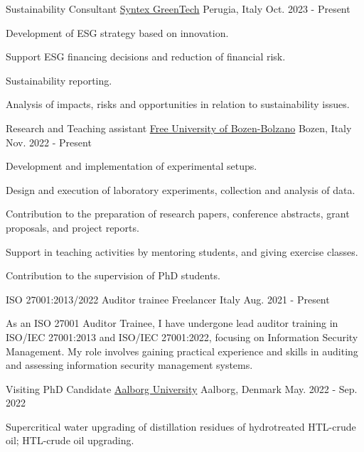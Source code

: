 
\begin{cventries}

\cventry
{Sustainability Consultant}
{\href{https://syntexgreen.tech}{Syntex GreenTech}}
{Perugia, Italy}
{Oct. 2023 - Present}
{\begin{cvitems}
\item {Development of ESG strategy based on innovation.}
\item {Support ESG financing decisions and reduction of financial risk.}
\item {Sustainability reporting.}
\item {Analysis of impacts, risks and opportunities in relation to sustainability issues.}
\end{cvitems}}

\cventry
{Research and Teaching assistant}
{\href{https://unibz.it}{Free University of Bozen-Bolzano}}
{Bozen, Italy}
{Nov. 2022 - Present}
{\begin{cvitems}
\item {Development and implementation of experimental setups.}
\item {Design and execution of laboratory experiments, collection and analysis of data.}
\item {Contribution to the preparation of research papers, conference abstracts, grant proposals, and project reports.}
\item {Support in teaching activities by mentoring students, and giving exercise classes.}
\item {Contribution to the supervision of PhD students.}
\end{cvitems}}

\cventry
{ISO 27001:2013/2022 Auditor trainee}
{Freelancer}
{Italy}
{Aug. 2021 - Present}
{\begin{cvitems}
\item {As an ISO 27001 Auditor Trainee, I have undergone lead auditor training in ISO/IEC 27001:2013 and ISO/IEC 27001:2022, focusing on Information Security Management. My role involves gaining practical experience and skills in auditing and assessing information security management systems.}
\end{cvitems}}

\cventry
{Visiting PhD Candidate}
{\href{https://www.en.aau.dk/}{Aalborg University}}
{Aalborg, Denmark}
{May. 2022 - Sep. 2022}
{\begin{cvitems}
\item {Supercritical water upgrading of distillation residues of hydrotreated HTL-crude oil; HTL-crude oil upgrading.}
\end{cvitems}}


\end{cventries}
